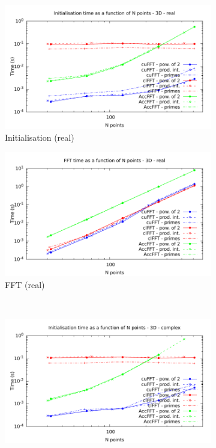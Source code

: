 \documentclass[12pt, a4paper]{article}
\begin{document}
\begin{figure}[htb]
\captionsetup{width=0.8\linewidth}
\centering
\begin{subfigure}{.5\textwidth}
\centering
\includegraphics[width=.9\linewidth]{graphs/fft-3d-r-init.pdf}
\caption{Initialisation (real)}
\label{FFT3DRI}
\end{subfigure}%
\begin{subfigure}{.5\textwidth}
\centering
\includegraphics[width=.9\linewidth]{graphs/fft-3d-r-exec.pdf}
\caption{FFT (real)}
\label{FFT3DRE}
\end{subfigure}\\
\begin{subfigure}{.5\textwidth}
\centering
\includegraphics[width=.9\linewidth]{graphs/fft-3d-c-init.pdf}

\end{subfigure}
\end{figure}
\end{document}

